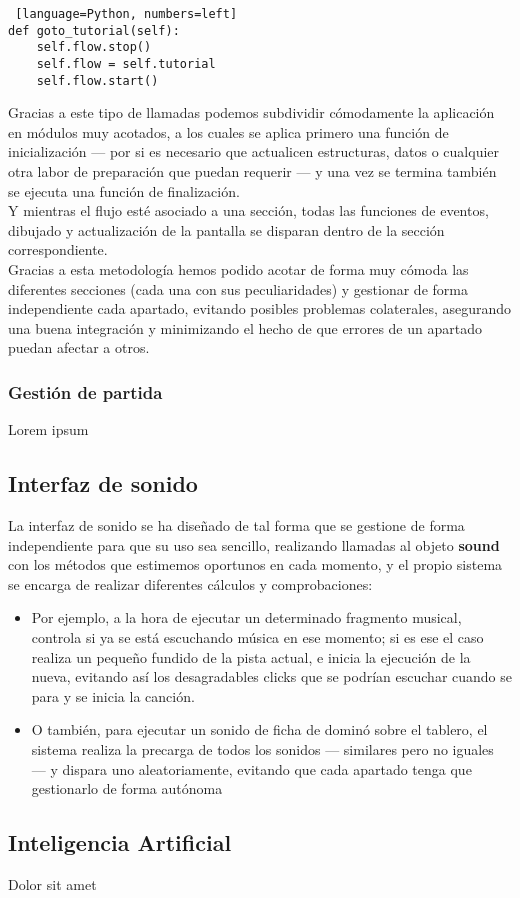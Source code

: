 \begin{lstlisting} [language=Python, numbers=left]
def goto_tutorial(self):
    self.flow.stop()
    self.flow = self.tutorial
    self.flow.start()
\end{lstlisting}

Gracias a este tipo de llamadas podemos subdividir cómodamente la aplicación en módulos muy acotados, a los cuales se aplica
primero una función de inicialización --- por si es necesario que actualicen estructuras, datos o cualquier otra labor
de preparación que puedan requerir --- y una vez se termina también se ejecuta una función de finalización. \\

Y mientras el flujo esté asociado a una sección, todas las funciones de eventos, dibujado y actualización de la pantalla
se disparan dentro de la sección correspondiente. \\

Gracias a esta metodología hemos podido acotar de forma muy cómoda las diferentes secciones (cada una con sus peculiaridades)
y gestionar de forma independiente cada apartado, evitando posibles problemas colaterales, asegurando una buena
integración y minimizando el hecho de que errores de un apartado puedan afectar a otros. \\



\subsubsection{Gestión de partida}

Lorem ipsum


\subsection{Interfaz de sonido}

La interfaz de sonido se ha diseñado de tal forma que se gestione de forma independiente para que su uso sea sencillo,
realizando llamadas al objeto \textbf{sound} con los métodos que estimemos oportunos en cada momento, y el propio
sistema se encarga de realizar diferentes cálculos y comprobaciones:

\begin{itemize} 
    \item Por ejemplo, a la hora de ejecutar un determinado fragmento musical, controla si ya se está escuchando música
        en ese momento; si es ese el caso realiza un pequeño fundido de la pista actual, e inicia la ejecución de la
        nueva, evitando así los desagradables clicks que se podrían escuchar cuando se para y se inicia la canción.
    \item O también, para ejecutar un sonido de ficha de dominó sobre el tablero, el sistema realiza la precarga de todos
        los sonidos --- similares pero no iguales --- y dispara uno aleatoriamente, evitando que cada apartado tenga
        que gestionarlo de forma autónoma
\end{itemize}

\subsection{Inteligencia Artificial}

Dolor sit amet
